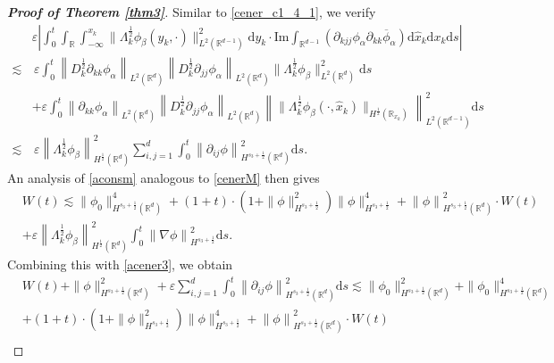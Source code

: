 \documentclass[10pt,a4paper]{amsart}
\begin{document}
\begin{proof}[\textbf{Proof of Theorem \ref{thm3}}]
	Similar to \eqref{cener_c1_4_1}, we verify
	\begin{align*}
		&\varepsilon \left| \int_0^t	\int_{\mathbb{R}}\int_{-\infty}^{x_k} \|\Lambda_k^{\frac 12}\phi_{\beta}(y_k,\cdot)\|^2_{L^2(\mathbb{R}^{d-1})} \mathrm{d} y_k   \cdot\mathrm{Im}\int_{\mathbb{R}^{d-1}} \left(\partial_{kjj}\phi_{\alpha } \partial_{kk}\overline{\phi}_\alpha\right) \mathrm{d} \hat{x}_k\mathrm{d} x_k\mathrm{d} s\right|\\
		\lesssim &\,\varepsilon \int_0^t \left\|   D_k^{\frac 12}  \partial_{kk}\phi_\alpha\right\|_{L^2(\mathbb{R}^d)}  \left\|   D_k^{\frac 12} \partial_{jj}\phi_\alpha\right\|_{L^2(\mathbb{R}^d)} \|\Lambda_k^{\frac 12}\phi_{\beta}\|_{L^{2}(\mathbb{R}^d)}^2 \mathrm{d} s\nonumber\\
		&+\varepsilon\int_0^t \left\|    \partial_{kk}\phi_{\alpha}\right\|_{L^2(\mathbb{R}^d)}   \left\|   D_k^{\frac 12} \partial_{jj}\phi_\alpha\right\|_{L^2(\mathbb{R}^d)} \left\| \|\Lambda_k^{\frac 12}\phi_{\beta}(\cdot,\hat{x}_k)\|_{H^{\frac12}(\mathbb{R}_{x_k})} \right\|_{L^{2}(\mathbb{R}^{d-1})}^2 \mathrm{d} s\nonumber\\
		\lesssim &\,\varepsilon \left\| \Lambda_k^{\frac 12}\phi_{\beta}\right\|_{H^{\frac12}(\mathbb{R}^d)}^2  \sum_{i,j=1}^d\int_0^t\left\| \partial_{ij}\phi\right\|_{H^{s_3+\frac 12}(\mathbb{R}^d)}^2 \mathrm{d} s.
	\end{align*}
An analysis of \eqref{aconsm} analogous to \eqref{cenerM} then gives
	\begin{align*}
		&W(t) \lesssim   \|\phi_0\|^4_{H^{s_3+\frac 12}(\mathbb{R}^{d})} +  (1+t)\cdot\left(1+\|\phi\|_{H^{s_3+\frac 12}}^2\right)\|\phi\|_{H^{s_3+\frac 12}}^4+\left\|  \phi\right\|_{H^{s_3+\frac 12}(\mathbb{R}^d)}^2 \cdot W (t)\\
		&+\varepsilon \left\| \Lambda_k^{\frac 12}\phi_{\beta}\right\|_{H^{\frac12}(\mathbb{R}^d)}^2\int_0^t\left\| \nabla\phi\right\|_{H^{s_3+\frac 12}}^2 \mathrm{d} s. \nonumber
	\end{align*}
Combining this with \eqref{acener3}, we obtain
	\begin{align*}
		&W(t) +\|\phi\|_{H^{s_3+\frac12}(\mathbb{R}^{d})}^2+\varepsilon  \sum_{i,j=1}^d\int_0^t\left\| \partial_{ij}\phi\right\|_{H^{s_3+\frac 12}(\mathbb{R}^d)}^2 \mathrm{d} s\lesssim  \|\phi_0\|_{H^{s_3+\frac12}(\mathbb{R}^{d})}^2+\|\phi_0\|_{H^{s_3+\frac12}(\mathbb{R}^{d})}^4\nonumber\\
		&+(1+t)\cdot\left(1+\|\phi\|_{H^{s_3+\frac 12}}^2\right)\|\phi\|_{H^{s_3+\frac 12}}^4+\left\|  \phi\right\|_{H^{s_3+\frac 12}(\mathbb{R}^d)}^2 \cdot W (t)\nonumber\\

\end{align*}
\end{proof}
\end{document}
